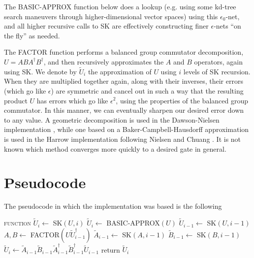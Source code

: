 \documentclass[a0,portrait]{a0poster}
\begin{document}
\begin{multicols}{2}
		The BASIC-APPROX function below does a lookup (e.g. using some kd-tree search
		maneuvers through higher-dimensional vector spaces) using this $\epsilon_0$-net,
		and all higher recursive calls to SK are effectively constructing
		finer $\epsilon$-nets ``on the fly'' as needed.
		
		The FACTOR function performs a balanced group commutator decomposition,
		$U = ABA^\dagger B^\dagger$, and then recursively approximates the $A$ and $B$
		operators, again using SK. We denote by $\tilde{U}_i$ the approximation
		of $U$ using $i$ levels of SK recursion. When they are multiplied
		together again, along with their inverses, their errors (which go like
		$\epsilon$) are symmetric and cancel out in such a way that the resulting
		product $U$ has errors which go like $\epsilon^2$, using the properties of
		the balanced group commutator. In this manner, we can
		eventually sharpen our desired error down to any value. A
		geometric decomposition is used in the Dawson-Nielsen implementation \cite{Dawson2005},
		while one based on a Baker-Campbell-Hausdorff approximation is used in the
		Harrow implementation \cite{Harrow2001} following
		Nielsen and Chuang \cite{Nielsen2000}. It is not
		known which method converges more quickly to a desired gate in general.
		
		
		
		\color{SaddleBrown}
		
		\section*{Pseudocode}
		The pseudocode in which the implementation was based is the following
		
		\begin{minipage}{50cm}
			\begin{algorithmic}[1]
				\STATE \textsc{function} $\tilde{U}_i \leftarrow$ SK$(U,i)$
				\STATE $\tilde{U}_i \leftarrow $ BASIC-APPROX$(U)$
				\ELSE
				\STATE $\tilde{U}_{i-1} \leftarrow$ SK$(U, i-1)$
				\STATE $A,B \leftarrow $ FACTOR$(U\tilde{U}^\dagger_{i-1})$
				\STATE $\tilde{A}_{i-1} \leftarrow $ SK$(A, i-1)$
				\STATE $\tilde{B}_{i-1} \leftarrow $ SK$(B, i-1)$
				\STATE $\tilde{U}_i \leftarrow \tilde{A}_{i-1}\tilde{B}_{i-1}\tilde{A}^\dagger_{i-1}\tilde{B}^\dagger_{i-1}\tilde{U}_{i-1}$
				\ENDIF
				\STATE return $\tilde{U}_i$
			\end{algorithmic}
			\centering
			\label{sk-code}
		\end{minipage}
		

\end{multicols}
\end{document}
